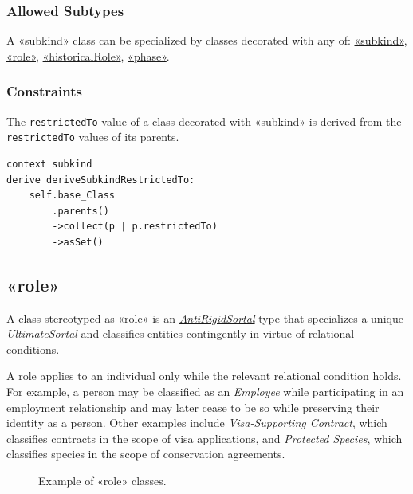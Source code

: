 \subsubsection{Allowed Subtypes}

A «subkind» class can be specialized by classes decorated with any of:
\hyperref[stereotype:subkind]{«subkind»}, \hyperref[stereotype:role]{«role»}, \hyperref[stereotype:historicalRole]{«historicalRole»}, \hyperref[stereotype:phase]{«phase»}.

\subsubsection{Constraints}

\begin{constraint}
\label{modeRestrictedTo}
The \texttt{restrictedTo} value of a class decorated with «subkind» is derived from the \texttt{restrictedTo} values of its parents.

\begin{lstlisting}[language=OCL]
context subkind 
derive deriveSubkindRestrictedTo:
    self.base_Class
        .parents()
        ->collect(p | p.restrictedTo)
        ->asSet()
\end{lstlisting}
\end{constraint}

\subsection{«role»}
\label{stereotype:role}

A class stereotyped as «role» is an \hyperref[stereotype:antiRigidSortal]{\textit{AntiRigidSortal}} type that specializes a unique \hyperref[stereotype:ultimateSortal]{\textit{UltimateSortal}} and classifies entities contingently in virtue of relational conditions.

A role applies to an individual only while the relevant relational condition holds. For example, a person may be classified as an \textit{Employee} while participating in an employment relationship and may later cease to be so while preserving their identity as a person. Other examples include \textit{Visa-Supporting Contract}, which classifies contracts in the scope of visa applications, and \textit{Protected Species}, which classifies species in the scope of conservation agreements.

\begin{figure}[h]
    \centering
    
    \caption{Example of «role» classes.}
    \label{fig:role-example}
\end{figure}

